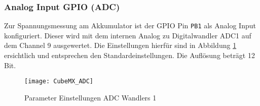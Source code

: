 \subsubsection{Analog Input GPIO (ADC)}
\label{sec:CubeMXADC}

Zur Spannungsmessung am Akkumulator ist der GPIO Pin \texttt{PB1} als Analog Input konfiguriert.
Dieser wird mit dem internen Analog zu Digitalwandler ADC1 auf dem Channel 9 ausgewertet.
Die Einstellungen hierfür sind in Abbildung \ref{pic:CubeMX_ADC} ersichtlich und entsprechen den Standardeinstellungen. Die Auflösung beträgt 12 Bit.

\begin{figure}[H]
	\centering
	\texttt{[image: CubeMX\_ADC]}
	\caption{Parameter Einstellungen ADC Wandlers 1}
	\label{pic:CubeMX_ADC}
\end{figure}



